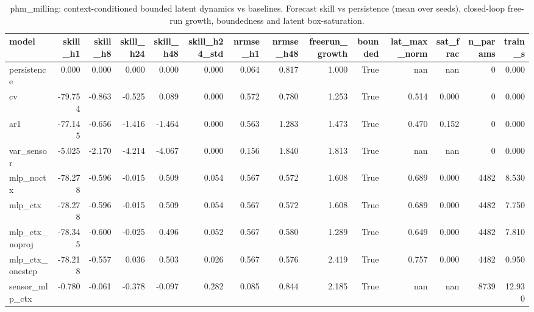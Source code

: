 \begin{table}[t]
\centering
\caption{phm_milling: context-conditioned bounded latent dynamics vs baselines. Forecast skill vs persistence (mean over seeds), closed-loop free-run growth, boundedness and latent box-saturation.}
\label{tab:phm_milling_latentdyn}
\begin{tabular}{lrrrrrrrrrrrrr}
\toprule
model & skill\_h1 & skill\_h8 & skill\_h24 & skill\_h48 & skill\_h24\_std & nrmse\_h1 & nrmse\_h48 & freerun\_growth & bounded & lat\_max\_norm & sat\_frac & n\_params & train\_s \\
\midrule
persistence & 0.000 & 0.000 & 0.000 & 0.000 & 0.000 & 0.064 & 0.817 & 1.000 & True & nan & nan & 0 & 0.000 \\
cv & -79.754 & -0.863 & -0.525 & 0.089 & 0.000 & 0.572 & 0.780 & 1.253 & True & 0.514 & 0.000 & 0 & 0.000 \\
ar1 & -77.145 & -0.656 & -1.416 & -1.464 & 0.000 & 0.563 & 1.283 & 1.473 & True & 0.470 & 0.152 & 0 & 0.000 \\
var\_sensor & -5.025 & -2.170 & -4.214 & -4.067 & 0.000 & 0.156 & 1.840 & 1.813 & True & nan & nan & 0 & 0.000 \\
mlp\_noctx & -78.278 & -0.596 & -0.015 & 0.509 & 0.054 & 0.567 & 0.572 & 1.608 & True & 0.689 & 0.000 & 4482 & 8.530 \\
mlp\_ctx & -78.278 & -0.596 & -0.015 & 0.509 & 0.054 & 0.567 & 0.572 & 1.608 & True & 0.689 & 0.000 & 4482 & 7.750 \\
mlp\_ctx\_noproj & -78.345 & -0.600 & -0.025 & 0.496 & 0.052 & 0.567 & 0.580 & 1.289 & True & 0.649 & 0.000 & 4482 & 7.810 \\
mlp\_ctx\_onestep & -78.218 & -0.557 & 0.036 & 0.503 & 0.026 & 0.567 & 0.576 & 2.419 & True & 0.757 & 0.000 & 4482 & 0.950 \\
sensor\_mlp\_ctx & -0.780 & -0.061 & -0.378 & -0.097 & 0.282 & 0.085 & 0.844 & 2.185 & True & nan & nan & 8739 & 12.930 \\
\bottomrule
\end{tabular}
\end{table}